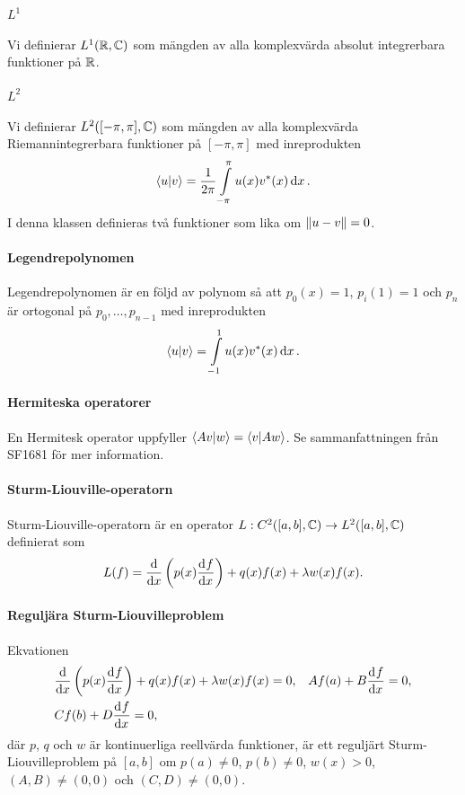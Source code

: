 \paragraph{$L^{1}$}
Vi definierar $L^{1}(\mathbb{R}, \mathbb{C})$ som mängden av alla komplexvärda absolut integrerbara funktioner på $\mathbb{R}$.

\paragraph{$L^{2}$}
Vi definierar $L^{2}([-\pi, \pi], \mathbb{C})$ som mängden av alla komplexvärda Riemannintegrerbara funktioner på $[-\pi, \pi]$ med inreprodukten
\begin{align*}
	\bra{u}\ket{v} = \frac{1}{2\pi}\int\limits_{-\pi}^{\pi}u(x)v^{*}(x)\dd{x}.
\end{align*}
I denna klassen definieras två funktioner som lika om $\norm{u - v} = 0$.

\paragraph{Legendrepolynomen}
Legendrepolynomen är en följd av polynom så att $p_{0}(x) = 1$, $p_{i}(1) = 1$ och $p_{n}$ är ortogonal på $p_{0}, \dots, p_{n - 1}$ med inreprodukten
\begin{align*}
	\bra{u}\ket{v} = \int\limits_{-1}^{1}u(x)v^{*}(x)\dd{x}.
\end{align*}

\paragraph{Hermiteska operatorer}
En Hermitesk operator uppfyller $\bra{Av}\ket{w} = \bra{v}\ket{Aw}$. Se sammanfattningen från SF1681 för mer information.

\paragraph{Sturm-Liouville-operatorn}
Sturm-Liouville-operatorn är en operator $L: C^{2}([a, b], \mathbb{C}) \to L^{2}([a, b], \mathbb{C})$ definierat som
\begin{align*}
	L(f) = \dv{x}\left(p(x)\dv[]{f}{x} (x)\right) + q(x)f(x) + \lambda w(x)f(x).
\end{align*}

\paragraph{Reguljära Sturm-Liouvilleproblem}
Ekvationen
\begin{align*}
	&\dv{x}\left(p(x)\dv[]{f}{x} (x)\right) + q(x)f(x) + \lambda w(x)f(x) = 0,
	&Af(a) + B\dv[]{f}{x} (a) = 0, \\
	&Cf(b) + D\dv[]{f}{x} (b) = 0,
\end{align*}
där $p$, $q$ och $w$ är kontinuerliga reellvärda funktioner, är ett reguljärt Sturm-Liouvilleproblem på $[a, b]$ om $p(a) \neq 0$, $p(b) \neq 0$,  $w(x) > 0$, $(A, B) \neq (0, 0)$ och $(C, D) \neq (0, 0)$.

